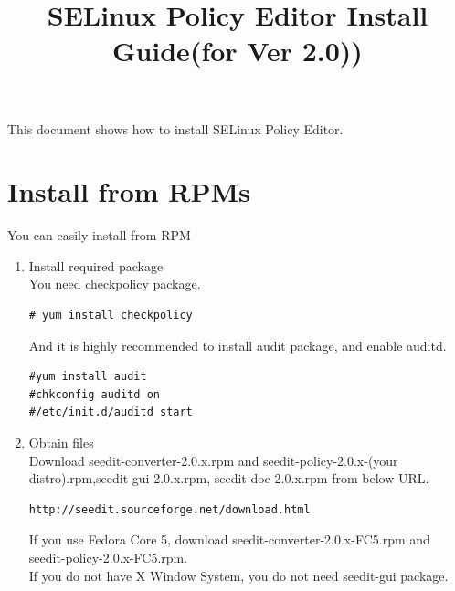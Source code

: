 \documentclass{article}
\title{SELinux Policy Editor Install Guide(for Ver 2.0))}
\begin{document}
\def\labelenumi{(\theenumi)}
\maketitle
\tableofcontents
\newpage

This document shows how to install SELinux Policy Editor.

\section{Install from RPMs}\label{sec:rpm}
You can easily install from RPM
\begin{enumerate}
 \item Install required package\\
       You need checkpolicy package.
\begin{verbatim}
# yum install checkpolicy		
\end{verbatim}
And it is highly recommended to install audit package, and enable
       auditd.
\begin{verbatim}
#yum install audit
#chkconfig auditd on
#/etc/init.d/auditd start
\end{verbatim}


    \item Obtain files\\
Download seedit-converter-2.0.x.rpm and seedit-policy-2.0.x-(your
	  distro).rpm,seedit-gui-2.0.x.rpm, seedit-doc-2.0.x.rpm 
from below URL.
\begin{verbatim}
http://seedit.sourceforge.net/download.html
\end{verbatim}
If you use Fedora Core 5, download seedit-converter-2.0.x-FC5.rpm and
       seedit-policy-2.0.x-FC5.rpm.\\
If you do not have X Window System, you do not need seedit-gui package.


\end{enumerate}
\end{document}
